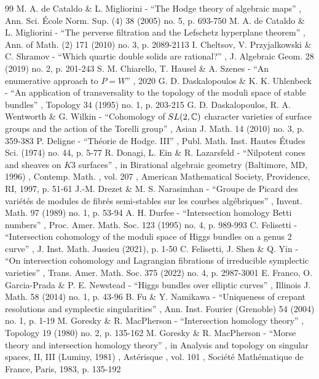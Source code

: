 \documentclass[11pt]{article}
\theoremstyle{definition}
\begin{document}
\begin{thebibliography}{99}
 M. A. de Cataldo \& L. Migliorini - “The Hodge theory of algebraic maps” , Ann. Sci. École Norm. Sup. (4) 38 (2005) no. 5, p. 693-750
 M. A. de Cataldo \& L. Migliorini - “The perverse filtration and the Lefschetz hyperplane theorem” , Ann. of Math. (2) 171 (2010) no. 3, p. 2089-2113
 I. Cheltsov, V. Przyjalkowski \& C. Shramov - “Which quartic double solids are rational?” , J. Algebraic Geom. 28 (2019) no. 2, p. 201-243
 S. M. Chiarello, T. Hausel \& A. Szenes - “An enumerative approach to $P=W$” , 2020
 G. D. Daskalopoulos \& K. K. Uhlenbeck - “An application of transversality to the topology of the moduli space of stable bundles” , Topology 34 (1995) no. 1, p. 203-215
 G. D. Daskalopoulos, R. A. Wentworth \& G. Wilkin - “Cohomology of ${\rm SL}(2,\mathbb{C})$ character varieties of surface groups and the action of the Torelli group” , Asian J. Math. 14 (2010) no. 3, p. 359-383
 P. Deligne - “Théorie de Hodge. III” , Publ. Math. Inst. Hautes Études Sci. (1974) no. 44, p. 5-77
 R. Donagi, L. Ein \& R. Lazarsfeld - “Nilpotent cones and sheaves on $K3$ surfaces” , in Birational algebraic geometry (Baltimore, MD, 1996) , Contemp. Math. , vol. 207 , American Mathematical Society, Providence, RI, 1997, p. 51-61
 J.-M. Drezet \& M. S. Narasimhan - “Groupe de Picard des variétés de modules de fibrés semi-stables sur les courbes algébriques” , Invent. Math. 97 (1989) no. 1, p. 53-94
 A. H. Durfee - “Intersection homology Betti numbers” , Proc. Amer. Math. Soc. 123 (1995) no. 4, p. 989-993
 C. Felisetti - “Intersection cohomology of the moduli space of Higgs bundles on a genus 2 curve” , J. Inst. Math. Jussieu (2021), p. 1-50
 C. Felisetti, J. Shen \& Q. Yin - “On intersection cohomology and Lagrangian fibrations of irreducible symplectic varieties” , Trans. Amer. Math. Soc. 375 (2022) no. 4, p. 2987-3001
 E. Franco, O. Garcia-Prada \& P. E. Newstead - “Higgs bundles over elliptic curves” , Illinois J. Math. 58 (2014) no. 1, p. 43-96
 B. Fu \& Y. Namikawa - “Uniqueness of crepant resolutions and symplectic singularities” , Ann. Inst. Fourier (Grenoble) 54 (2004) no. 1, p. 1-19
 M. Goresky \& R. MacPherson - “Intersection homology theory” , Topology 19 (1980) no. 2, p. 135-162
 M. Goresky \& R. MacPherson - “Morse theory and intersection homology theory” , in Analysis and topology on singular spaces, II, III (Luminy, 1981) , Astérisque , vol. 101 , Société Mathématique de France, Paris, 1983, p. 135-192

\end{thebibliography}
\end{document}
